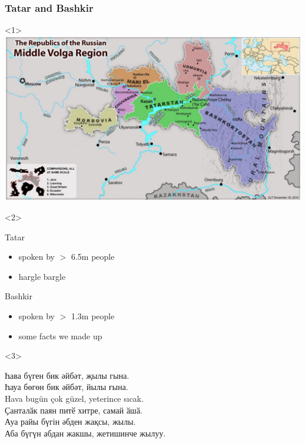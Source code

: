 \documentclass[10pt,xetex]{beamer} %
\begin{document}
\begin{frame}
  \frametitle{Tatar and Bashkir} %

\begin{onlyenv}<1>
\includegraphics[width=\textwidth]{middlevolga19001500.jpg}
\end{onlyenv}
\begin{onlyenv}<2>

\begin{block}{Tatar}

\begin{itemize}
  \item spoken by $>$ 6.5m  people
  \item hargle bargle
\end{itemize}

\end{block}

\begin{block}{Bashkir}

\begin{itemize}
  \item spoken by $>$ 1.3m people
  \item some facts we made up
\end{itemize}


\end{block}

\end{onlyenv}
\begin{onlyenv}<3>

Һава бүген бик әйбәт, җылы гына.  \\
Һауа бөгөн бик әйбәт, йылы ғына. \\

Hava bugün çok güzel, yeterince sıcak. \\
Ҫанталӑк паян питӗ хитре, самай ӑшӑ. \\
Ауа райы бүгін әбден жақсы, жылы. \\
Аба бүгүн абдан жакшы, жетишинче жылуу. 

\end{onlyenv}

\end{frame}
\end{document}
